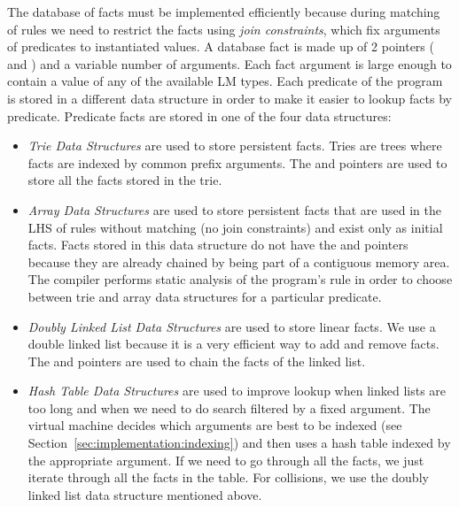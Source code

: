 The database of facts must be implemented efficiently because during matching of
rules we need to restrict the facts using \emph{join constraints}, which fix
arguments of predicates to instantiated values. A database fact is made up of 2
pointers ( and ) and a variable number of arguments.  Each
fact argument is large enough to contain a value of any of the available LM
types. Each predicate of the program is stored in a different data structure in
order to make it easier to lookup facts by predicate. Predicate facts are stored
in one of the four data structures:

\begin{itemize}

\item \emph{Trie Data Structures} are used to store persistent facts. Tries are
   trees where facts are indexed by common prefix arguments. The 
   and  pointers are used to store all the facts stored in the trie.

\item \emph{Array Data Structures} are used to store persistent facts that are
   used in the LHS of rules without matching (no join constraints) and exist
   only as initial facts. Facts stored in this data structure do not have the
    and  pointers because they are already chained by
   being part of a contiguous memory area. The compiler performs static analysis
   of the program's rule in order to choose between trie and array data
   structures for a particular predicate.

\item \emph{Doubly Linked List Data Structures} are used to store linear facts.
   We use a double linked list because it is a very efficient way to add and
   remove facts. The  and  pointers are used to chain
   the facts of the linked list.

\item \emph{Hash Table Data Structures} are used to improve lookup when linked
   lists are too long and when we need to do search filtered by a fixed
   argument. The virtual machine decides which arguments are best to be indexed
   (see Section~\ref{sec:implementation:indexing}) and then uses a hash table
   indexed by the appropriate argument. If we need to go through all the facts,
   we just iterate through all the facts in the table. For collisions, we use
   the doubly linked list data structure mentioned above.

\end{itemize}

